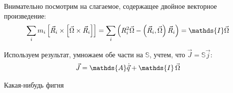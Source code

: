 \documentclass[12pt]{article}
\newcommand{\bbA}{\mathds{A}}
\newcommand{\bbI}{\mathds{I}}
\newcommand{\bbS}{\mathds{S}}
\newcommand{\lb}{\left(}
\newcommand{\rb}{\right)}
\begin{document}
Внимательно посмотрим на слагаемое, содержащее двойное векторное произведение:
\begin{gather}
\sum_i m_i \left[ \vec{R}_i \times \left[ \vec{\Omega} \times \vec{R}_i \right] \right] = \sum_i \lb R_i^2 \vec{\Omega} - \lb \vec{R}_i , \vec{\Omega} \rb \vec{R}_i \rb = \bbI \vec{\Omega} \notag
\end{gather}

Используем результат, умножаем обе части на $\bbS$, учтем, что $\vec{J} = \bbS \vec{j}$: 
\begin{gather}
\vec{J} = \bbA \dot{\vec{q}} + \bbI \, \vec{\Omega} \notag 
\end{gather}

Какая-нибудь фигня
\end{document}
